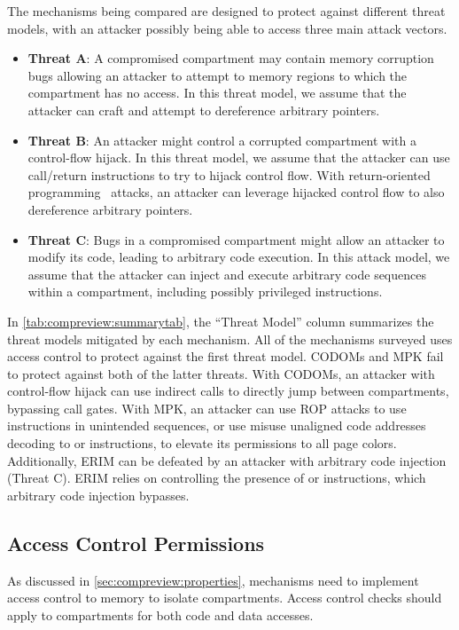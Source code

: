 The mechanisms being compared are designed to protect against different
threat models, with an attacker possibly being able to access three
main attack vectors.
\begin{itemize}
      \item \textbf{Threat A}:
            A compromised compartment may contain memory corruption bugs 
            allowing an attacker to attempt to memory regions to which the 
            compartment has no access.
            In this threat model, we assume that the attacker can craft and
            attempt to dereference arbitrary pointers.
      \item \textbf{Threat B}:
            An attacker might control a corrupted compartment with a 
            control-flow hijack.
            In this threat model, we assume that the attacker can use 
            call/return instructions to try to hijack control flow. 
            With return-oriented programming~\cite{Shacham07,vander17} attacks,
            an attacker can leverage hijacked control flow to also dereference
            arbitrary pointers.
      \item \textbf{Threat C}:
            Bugs in a compromised compartment might allow an attacker to modify
            its code, leading to arbitrary code execution.
            In this attack model, we assume that the attacker can inject and 
            execute arbitrary code sequences within a compartment, including 
            possibly privileged instructions.
\end{itemize}

In \autoref{tab:compreview:summarytab}, the ``Threat Model'' column summarizes
the threat models mitigated by each mechanism.
All of the mechanisms surveyed uses access control to protect against the 
first threat model.
CODOMs and MPK fail to protect against both of the latter threats.
With CODOMs, an attacker with control-flow hijack can use indirect calls to
directly jump between compartments, bypassing call gates.
With MPK, an attacker can use ROP attacks to use  instructions
in unintended sequences, or use misuse unaligned code addresses decoding to
 or  instructions, to elevate its permissions to
all page colors.
Additionally, ERIM can be defeated by an attacker with arbitrary code 
injection (Threat C). 
ERIM relies on controlling the presence of  or 
instructions, which arbitrary code injection bypasses.

\subsection{Access Control Permissions}
As discussed in \autoref{sec:compreview:properties}, mechanisms need to 
implement access control to memory to isolate compartments.
Access control checks should apply to compartments for both code and data
accesses.

